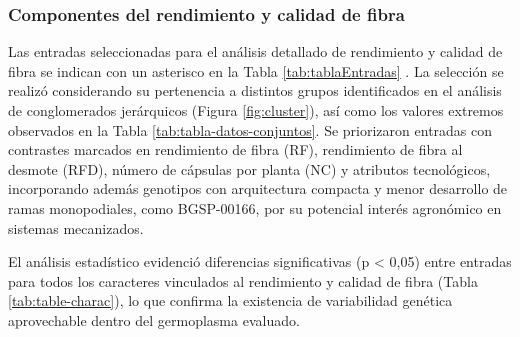 \documentclass[12pt,oneside]{reedthesis}
\begin{document}
\subsubsection{Componentes del rendimiento y calidad de fibra}\label{componentes-del-rendimiento-y-calidad-de-fibra}

Las entradas seleccionadas para el análisis detallado de rendimiento y calidad de fibra se indican con un asterisco en la Tabla \ref{tab:tablaEntradas} . La selección se realizó considerando su pertenencia a distintos grupos identificados en el análisis de conglomerados jerárquicos (Figura \ref{fig:cluster}), así como los valores extremos observados en la Tabla \ref{tab:tabla-datos-conjuntos}. Se priorizaron entradas con contrastes marcados en rendimiento de fibra (RF), rendimiento de fibra al desmote (RFD), número de cápsulas por planta (NC) y atributos tecnológicos, incorporando además genotipos con arquitectura compacta y menor desarrollo de ramas monopodiales, como BGSP-00166, por su potencial interés agronómico en sistemas mecanizados.

El análisis estadístico evidenció diferencias significativas (p \textless{} 0,05) entre entradas para todos los caracteres vinculados al rendimiento y calidad de fibra (Tabla \ref{tab:table-charac}), lo que confirma la existencia de variabilidad genética aprovechable dentro del germoplasma evaluado.
\end{document}
